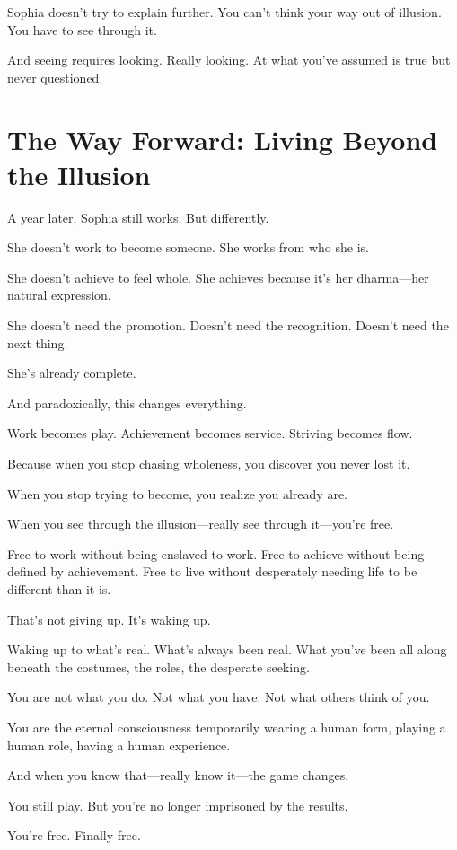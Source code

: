 \documentclass[11pt,twoside]{book}
\begin{document}
Sophia doesn't try to explain further. You can't think your way out of illusion. You have to see through it.

And seeing requires looking. Really looking. At what you've assumed is true but never questioned.

\section*{The Way Forward: Living Beyond the Illusion}

A year later, Sophia still works. But differently.

She doesn't work to become someone. She works from who she is.

She doesn't achieve to feel whole. She achieves because it's her dharma—her natural expression.

She doesn't need the promotion. Doesn't need the recognition. Doesn't need the next thing.

She's already complete.

And paradoxically, this changes everything.

Work becomes play. Achievement becomes service. Striving becomes flow.

Because when you stop chasing wholeness, you discover you never lost it.

When you stop trying to become, you realize you already are.

When you see through the illusion—really see through it—you're free.

Free to work without being enslaved to work. Free to achieve without being defined by achievement. Free to live without desperately needing life to be different than it is.

That's not giving up. It's waking up.

Waking up to what's real. What's always been real. What you've been all along beneath the costumes, the roles, the desperate seeking.

You are not what you do. Not what you have. Not what others think of you.

You are the eternal consciousness temporarily wearing a human form, playing a human role, having a human experience.

And when you know that—really know it—the game changes.

You still play. But you're no longer imprisoned by the results.

You're free. Finally free.
\end{document}
